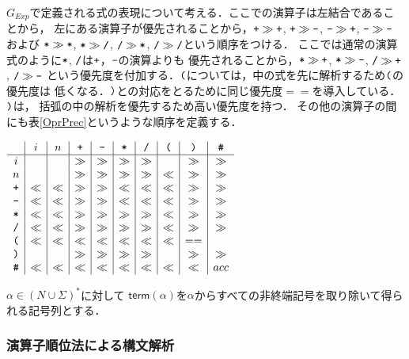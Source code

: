 \documentclass[dvipdfmx,a4j]{jbook}
\begin{document}
$G_{Exp}$で定義される式の表現について考える．ここでの演算子は左結合であることから，
左にある演算子が優先されることから，$\texttt{+}\gg\texttt{+}$, $\texttt{+}\gg\texttt{-}$,
$\texttt{-}\gg\texttt{+}$, $\texttt{-}\gg\texttt{-}$ および $\texttt{*}\gg\texttt{*}$, $\texttt{*}\gg\texttt{/}$,
$\texttt{/}\gg\texttt{*}$, $\texttt{/}\gg\texttt{/}$という順序をつける．
ここでは通常の演算式のように$\texttt{*}$, $\texttt{/}$は$\texttt{+}$，$\texttt{-}$の演算よりも
優先されることから，$\texttt{*}\gg\texttt{+}$, $\texttt{*}\gg\texttt{-}$, $\texttt{/}\gg\texttt{+}$, $\texttt{/}\gg\texttt{-}$
という優先度を付加する．$\texttt{(}$については，中の式を先に解析するため$\texttt{(}$の優先度は
低くなる．$\texttt{)}$との対応をとるために同じ優先度$==$を導入している．$\texttt{)}$は，
括弧の中の解析を優先するため高い優先度を持つ．
その他の演算子の間にも表\ref{OprPrec}というような順序を定義する．

\begin{table}
  \begin{center}
  $\begin{array}{c|c|c|c|c|c|c|c|c|c}
       & i & n & \texttt{+} & \texttt{-} & \texttt{*} & \texttt{/} & \texttt{(} & \texttt{)} & \texttt{\#}\\\hline
    i  &   &   & \gg   & \gg   &  \gg  &  \gg  &       & \gg   & \gg\\
    n  &   &   & \gg   & \gg   &  \gg  &  \gg  &  \ll  & \gg   & \gg\\
  \texttt{+}&\ll&\ll& \gg   & \gg   &  \ll  &  \ll  &  \ll  & \gg   & \gg \\
  \texttt{-}&\ll&\ll& \gg   & \gg   &  \ll  &  \ll  &  \ll  & \gg   & \gg \\
  \texttt{*}&\ll&\ll&\gg   & \gg   &  \gg  &  \gg  &  \ll   & \gg   & \gg \\
  \texttt{/}&\ll&\ll&\gg   & \gg   &  \gg  &  \gg  &  \ll   & \gg   & \gg\\
  \texttt{(}&\ll&\ll&\ll   & \ll   &  \ll  &  \ll  &  \ll   & ==   & \\
  \texttt{)}&   &   & \gg  & \gg   &  \gg  & \gg   &        & \gg  & \gg \\
  \texttt{\#} &\ll&\ll&\ll   & \ll   &  \ll  &  \ll  &  \ll   & \ll   & acc
  \end{array}$\end{center}
  \caption{演算子順位表}\label{OprPrec}
\end{table}

\begin{Def}
  $\alpha\in(N\cup\Sigma)^\ast$に対して
  $\mathsf{term}(\alpha)$を$\alpha$からすべての非終端記号を取り除いて得られる記号列とする．
\end{Def}

\subsubsection{演算子順位法による構文解析}
\end{document}
